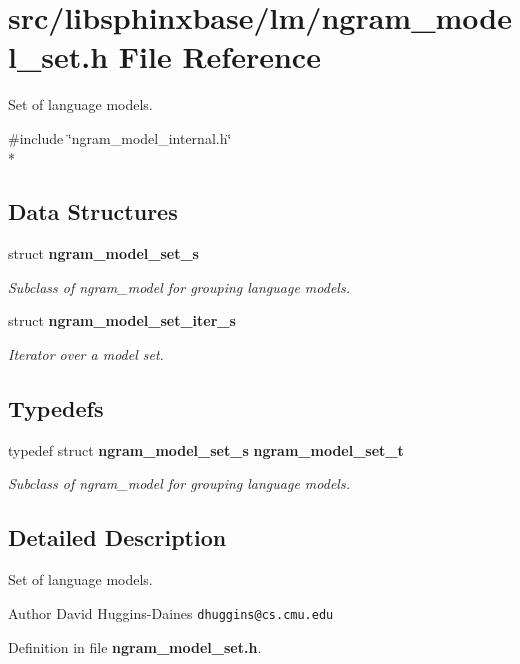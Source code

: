 \section{src/libsphinxbase/lm/ngram\-\_\-model\-\_\-set.h File Reference}
\label{ngram__model__set_8h}


Set of language models.  


{\ttfamily \#include \char`\"{}ngram\-\_\-model\-\_\-internal.\-h\char`\"{}}\\*
\subsection*{Data Structures}
\begin{DoxyCompactItemize}
\item 
struct {\bf ngram\-\_\-model\-\_\-set\-\_\-s}
\begin{DoxyCompactList}\small\item\em Subclass of ngram\-\_\-model for grouping language models. \end{DoxyCompactList}\item 
struct {\bf ngram\-\_\-model\-\_\-set\-\_\-iter\-\_\-s}
\begin{DoxyCompactList}\small\item\em Iterator over a model set. \end{DoxyCompactList}\end{DoxyCompactItemize}
\subsection*{Typedefs}
\begin{DoxyCompactItemize}
\item 
typedef struct {\bf ngram\-\_\-model\-\_\-set\-\_\-s} {\bf ngram\-\_\-model\-\_\-set\-\_\-t}\label{ngram__model__set_8h_af89b4060ed18e3f4e3ac0490a09d5745}

\begin{DoxyCompactList}\small\item\em Subclass of ngram\-\_\-model for grouping language models. \end{DoxyCompactList}\end{DoxyCompactItemize}


\subsection{Detailed Description}
Set of language models. \begin{DoxyAuthor}{Author}
David Huggins-\/\-Daines {\tt dhuggins@cs.\-cmu.\-edu} 
\end{DoxyAuthor}


Definition in file {\bf ngram\-\_\-model\-\_\-set.\-h}.

